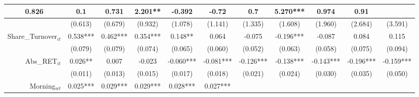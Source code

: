 \begin{table}
{\begin{tabular}{rcccccccccc}
  \multicolumn{1}{c|}{0.826} &
  \multicolumn{1}{c|}{0.1} &
  \multicolumn{1}{c|}{0.731} &
  \multicolumn{1}{c|}{2.201**} &
  \multicolumn{1}{c|}{-0.392} &
  \multicolumn{1}{c|}{-0.72} &
  \multicolumn{1}{c|}{0.7} &
  \multicolumn{1}{c|}{5.270***} &
  \multicolumn{1}{c|}{0.974} &
  \multicolumn{1}{c|}{0.91} \\ \hline
\multicolumn{1}{|r|}{} &
  \multicolumn{1}{c|}{(0.613)} &
  \multicolumn{1}{c|}{(0.679)} &
  \multicolumn{1}{c|}{(0.932)} &
  \multicolumn{1}{c|}{(1.078)} &
  \multicolumn{1}{c|}{(1.141)} &
  \multicolumn{1}{c|}{(1.335)} &
  \multicolumn{1}{c|}{(1.608)} &
  \multicolumn{1}{c|}{(1.960)} &
  \multicolumn{1}{c|}{(2.684)} &
  \multicolumn{1}{c|}{(3.591)} \\ \hline
\multicolumn{1}{|r|}{Share\_Turnover$_{it}$} &
  \multicolumn{1}{c|}{0.538***} &
  \multicolumn{1}{c|}{0.462***} &
  \multicolumn{1}{c|}{0.354***} &
  \multicolumn{1}{c|}{0.148**} &
  \multicolumn{1}{c|}{0.064} &
  \multicolumn{1}{c|}{-0.075} &
  \multicolumn{1}{c|}{-0.196***} &
  \multicolumn{1}{c|}{-0.087} &
  \multicolumn{1}{c|}{0.084} &
  \multicolumn{1}{c|}{0.115} \\ \hline
\multicolumn{1}{|r|}{} &
  \multicolumn{1}{c|}{(0.079)} &
  \multicolumn{1}{c|}{(0.079)} &
  \multicolumn{1}{c|}{(0.074)} &
  \multicolumn{1}{c|}{(0.065)} &
  \multicolumn{1}{c|}{(0.060)} &
  \multicolumn{1}{c|}{(0.052)} &
  \multicolumn{1}{c|}{(0.063)} &
  \multicolumn{1}{c|}{(0.058)} &
  \multicolumn{1}{c|}{(0.075)} &
  \multicolumn{1}{c|}{(0.094)} \\ \hline
\multicolumn{1}{|r|}{Abs\_RET$_{it}$} &
  \multicolumn{1}{c|}{0.026**} &
  \multicolumn{1}{c|}{0.007} &
  \multicolumn{1}{c|}{-0.023} &
  \multicolumn{1}{c|}{-0.060***} &
  \multicolumn{1}{c|}{-0.081***} &
  \multicolumn{1}{c|}{-0.126***} &
  \multicolumn{1}{c|}{-0.138***} &
  \multicolumn{1}{c|}{-0.143***} &
  \multicolumn{1}{c|}{-0.196***} &
  \multicolumn{1}{c|}{-0.159***} \\ \hline
\multicolumn{1}{|r|}{} &
  \multicolumn{1}{c|}{(0.011)} &
  \multicolumn{1}{c|}{(0.013)} &
  \multicolumn{1}{c|}{(0.015)} &
  \multicolumn{1}{c|}{(0.017)} &
  \multicolumn{1}{c|}{(0.018)} &
  \multicolumn{1}{c|}{(0.021)} &
  \multicolumn{1}{c|}{(0.024)} &
  \multicolumn{1}{c|}{(0.030)} &
  \multicolumn{1}{c|}{(0.035)} &
  \multicolumn{1}{c|}{(0.050)} \\ \hline
\multicolumn{1}{|r|}{Morning$_{wt}$} &
  \multicolumn{1}{c|}{0.025***} &
  \multicolumn{1}{c|}{0.029***} &
  \multicolumn{1}{c|}{0.029***} &
  \multicolumn{1}{c|}{0.028***} &
  \multicolumn{1}{c|}{0.027***} &

\end{tabular}}
\end{table}
